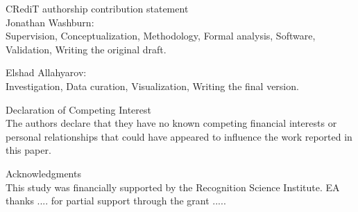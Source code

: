 \documentclass[%
  amsmath,amssymb,
  aps,
 prb,
 floatfix, showkeys
 ]{revtex4-2}
\begin{document}
 \onecolumngrid
 
 \vspace{0.3cm}
 
 {CRediT authorship contribution statement} \\
 Jonathan Washburn: \\
 Supervision,
 Conceptualization,
 Methodology,
 Formal analysis,
 Software,
 Validation,
 Writing the original draft.
 
 \vspace{0.20cm}
 
 Elshad Allahyarov: \\
 Investigation,
 Data curation,
 Visualization,
 Writing the final version.  
 
 {Declaration of Competing Interest} \\
 The authors declare that they have no known competing financial interests or personal relationships that
 could have appeared to influence the work reported in this paper.
 
 {Acknowledgments} \\
 This study was financially supported by the Recognition Science Institute.
 EA thanks .... for partial support through the grant .....
 
\end{document}
